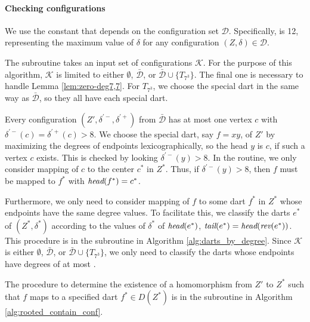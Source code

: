 \documentclass[main.tex]{subfiles}
\begin{document}
\paragraph{Checking configurations}
We use the constant \CONFDEGMAX that depends on the configuration set $\mathcal{D}$.
Specifically, \CONFDEGMAX is 12, representing the maximum value of $\delta$ for any configuration $(Z, \delta) \in \mathcal{D}$.

The \containConf subroutine takes an input set of configurations $\mathcal{K}$.
For the purpose of this algorithm, $\mathcal{K}$ is limited to either $\emptyset$, $\bar{\mathcal{D}}$, or $\bar{\mathcal{D}} \cup \{T_{7^3}\}$.
The final one is necessary to handle Lemma \ref{lem:zero-deg7,7}.
For $T_{7^3}$, we choose the special dart in the same way as $\bar{\mathcal{D}}$, so they all have each special dart.

Every configuration $(Z', \delta^{\prime-}, \delta^{\prime+})$ from $\bar{\mathcal{D}}$ has at most one vertex $c$ with $\delta^{\prime-}(c)=\delta^{\prime+}(c) > 8$.
We choose the special dart, say $f=xy$, of $Z'$ by maximizing the degrees of endpoints lexicographically, so the head $y$ is $c$, if such a vertex $c$ exists.
This is checked by looking $\delta^{\prime-}(y) > 8$.
In the \containConf routine, we only consider mapping of $c$ to the center $c^*$ in $Z^*$.
Thus, if $\delta^{\prime-}(y) > 8$, then $f$ must be mapped to $f^*$ with $\textit{head}(f^*)=c^*$.

Furthermore, we only need to consider mapping of $f$ to some dart $f^*$ in $Z^*$ whose endpoints have the same degree values.
To facilitate this, we classify the darts $e^*$ of $(Z^*, \delta^*)$ according to the values of $\delta^*$ of $\textit{head}(e^*)$, $\textit{tail}(e^*)=\textit{head}(\textit{rev}(e^*))$.
This procedure is in the \dartsByDegree subroutine in Algorithm \ref{alg:darts_by_degree}.
Since $\mathcal{K}$ is either $\emptyset$, $\bar{\mathcal{D}}$, or $\bar{\mathcal{D}} \cup \{T_{7^3}\}$, we only need to classify the darts whose endpoints have degrees of at most \CONFDEGMAX.

The procedure to determine the existence of a homomorphism from $Z'$ to $Z^*$ such that $f$ maps to a specified dart $f^* \in D(Z^*)$ is in the \rootedContainConf subroutine in Algorithm \ref{alg:rooted_contain_conf}.
\end{document}
